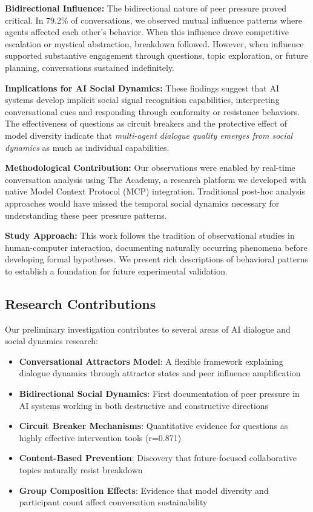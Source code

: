 \documentclass[11pt,letterpaper]{article}
\newcommand{\theacademy}{The Academy}
\newcommand{\exponedataBidirectionalPercentage}{79.2\%}
\newcommand{\exponedataQuestionCorrelation}{0.871}
\begin{document}
\textbf{Bidirectional Influence:} The bidirectional nature of peer pressure proved critical. In \exponedataBidirectionalPercentage{} of conversations, we observed mutual influence patterns where agents affected each other's behavior. When this influence drove competitive escalation or mystical abstraction, breakdown followed. However, when influence supported substantive engagement through questions, topic exploration, or future planning, conversations sustained indefinitely.

\textbf{Implications for AI Social Dynamics:} These findings suggest that AI systems develop implicit social signal recognition capabilities, interpreting conversational cues and responding through conformity or resistance behaviors. The effectiveness of questions as circuit breakers and the protective effect of model diversity indicate that \textit{multi-agent dialogue quality emerges from social dynamics} as much as individual capabilities.

\textbf{Methodological Contribution:} Our observations were enabled by real-time conversation analysis using \theacademy{}, a research platform we developed with native Model Context Protocol (MCP) integration. Traditional post-hoc analysis approaches would have missed the temporal social dynamics necessary for understanding these peer pressure patterns.

\textbf{Study Approach:} This work follows the tradition of observational studies in human-computer interaction, documenting naturally occurring phenomena before developing formal hypotheses. We present rich descriptions of behavioral patterns to establish a foundation for future experimental validation.

\subsection{Research Contributions}

Our preliminary investigation contributes to several areas of AI dialogue and social dynamics research:

\begin{itemize}
    \item \textbf{Conversational Attractors Model}: A flexible framework explaining dialogue dynamics through attractor states and peer influence amplification
    \item \textbf{Bidirectional Social Dynamics}: First documentation of peer pressure in AI systems working in both destructive and constructive directions
    \item \textbf{Circuit Breaker Mechanisms}: Quantitative evidence for questions as highly effective intervention tools (r=\exponedataQuestionCorrelation{})
    \item \textbf{Content-Based Prevention}: Discovery that future-focused collaborative topics naturally resist breakdown
    \item \textbf{Group Composition Effects}: Evidence that model diversity and participant count affect conversation sustainability
\end{itemize}
\end{document}

